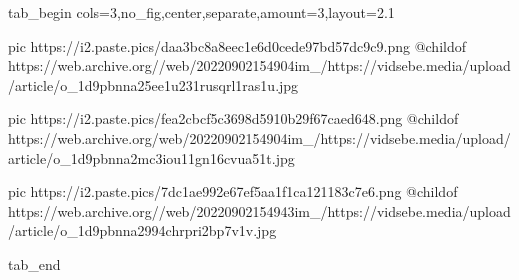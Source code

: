  
 
 
 
 


\ifcmt
  tab_begin cols=3,no_fig,center,separate,amount=3,layout=2.1

		 pic https://i2.paste.pics/daa3bc8a8eec1e6d0cede97bd57dc9c9.png
     @childof https://web.archive.org//web/20220902154904im_/https://vidsebe.media/upload/article/o_1d9pbnna25ee1u231rusqrl1ras1u.jpg

		 pic https://i2.paste.pics/fea2cbcf5c3698d5910b29f67caed648.png
		 @childof https://web.archive.org/web/20220902154904im_/https://vidsebe.media/upload/article/o_1d9pbnna2mc3iou11gn16cvua51t.jpg

		 pic https://i2.paste.pics/7dc1ae992e67ef5aa1f1ca121183c7e6.png
		 @childof https://web.archive.org//web/20220902154943im_/https://vidsebe.media/upload/article/o_1d9pbnna2994chrpri2bp7v1v.jpg

  tab_end
\fi
